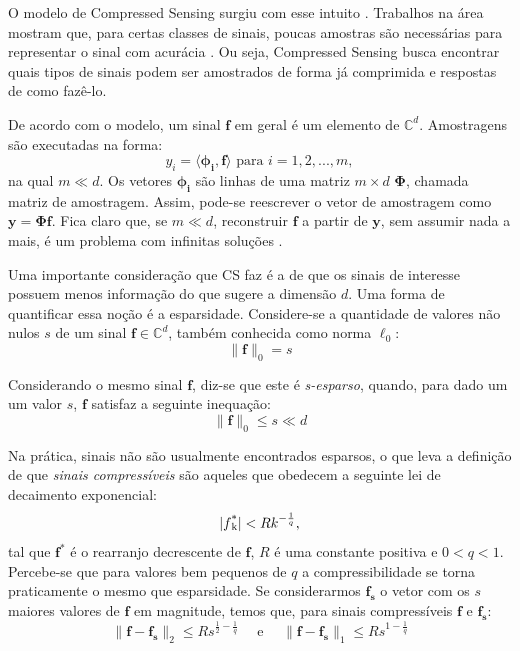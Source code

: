 \documentclass[cic,tc]{iiufrgs}
\def\SPSB#1#2{\rlap{\textsuperscript{#1}}\SB{#2}}
\def\SB#1{\textsubscript{#1}}
\renewcommand{\vec}[1]{\bm{#1}}
\begin{document}
O modelo de Compressed Sensing surgiu com esse intuito \cite{DonohoCS}. Trabalhos na área mostram que, para certas classes
de sinais, poucas amostras são necessárias para representar o sinal com acurácia \cite{chen2015compressed}.
Ou seja, Compressed Sensing busca encontrar quais tipos
de sinais podem ser amostrados de forma já comprimida e respostas de como fazê-lo.

De acordo com o modelo, um sinal $ \vec{f} $ em geral é um elemento de $ \mathbb{C}^d $. Amostragens são executadas na forma:
\begin{equation}
    y_i = \langle \vec{\phi_i}, \vec{f} \rangle \text{ para } i=1,2,...,m, 
\end{equation}
na qual $m \ll d$. Os vetores $\vec{\phi_i}$ são linhas de uma matriz $m \times d$ $\mathbf{\Phi}$, chamada matriz 
de amostragem. Assim, pode-se reescrever o vetor de amostragem como $\vec{y} = \mathbf{\Phi} \vec{f}$. Fica claro que, 
se $ m \ll d$, reconstruir $\vec{f}$ a partir de $\vec{y}$, sem assumir nada a mais, é um problema 
com infinitas soluções \cite{chen2015compressed}.

Uma importante consideração que CS faz é a de que os sinais de interesse possuem menos informação do que sugere a 
dimensão $d$. 
Uma forma de quantificar essa noção é a esparsidade.
Considere-se a quantidade de valores não
nulos $s$ de um sinal $\vec{f} \in \mathbb{C}^d$, também conhecida como norma $\ell_0$:
\begin{equation}
    \lVert \vec{f} \rVert_0 = s
\end{equation}

Considerando o mesmo sinal $\vec{f}$, diz-se que este é \textit{s-esparso}, quando, para dado um um valor $s$, $\vec{f}$
satisfaz a seguinte inequação:
\begin{equation}
    \label{eq:f0less}
    \lVert \vec{f} \rVert_0 \le s \ll d
\end{equation} 

Na prática, sinais não são usualmente encontrados esparsos, o que leva a definição de que \textit{sinais compressíveis}
são aqueles que obedecem a seguinte lei de decaimento exponencial:
\begin{equation}
    \label{eq:compressiblesignal}
    | f\SPSB{*}{k} | < R k^{-\frac{1}{q}},  
\end{equation}
tal que $\vec{f}^* $ é o rearranjo decrescente de $\vec{f}$, $R$ é uma constante positiva e $0< q < 1$. Percebe-se
que para valores bem pequenos de $q$ a compressibilidade se torna praticamente o mesmo que esparsidade. Se considerarmos
$\vec{f_s}$ o vetor com os $s$ maiores valores de $\vec{f}$ em magnitude, temos que, para sinais compressíveis $\vec{f}$ e 
$\vec{f_s}$:
\begin{equation}
    \lVert \vec{f} - \vec{f_s} \rVert_2 \le Rs^{\frac{1}{2} - \frac{1}{q}} \hspace{1em} \text{ e } \hspace{1em}
    \lVert \vec{f} - \vec{f_s} \rVert_1 \le Rs^{1 - \frac{1}{q}} 
\end{equation} 
\end{document}
